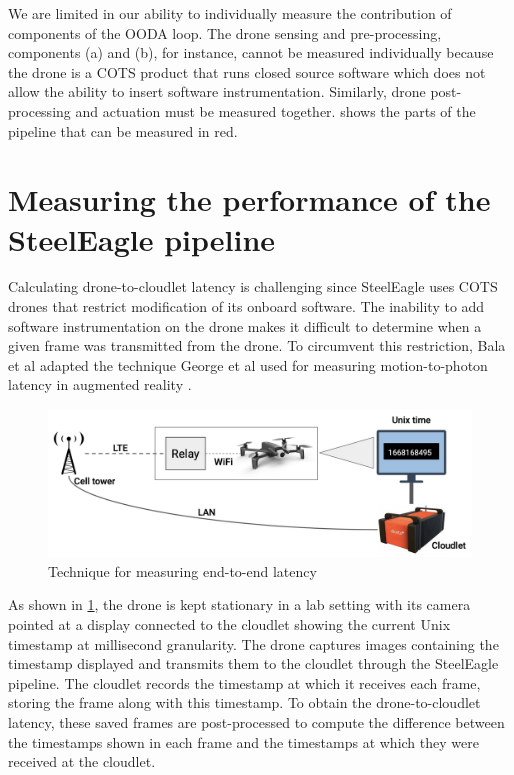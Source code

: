 We are limited in our ability to individually measure the contribution of
components of the OODA loop. The drone sensing and pre-processing, components
(a) and (b), for instance, cannot be measured individually because the drone is
a COTS product that runs closed source software which does not allow the
ability to insert software instrumentation. Similarly, drone post-processing
and actuation must be measured together.   shows
the parts of the pipeline that can be measured in red.

\section{Measuring the performance of the SteelEagle pipeline}
\label{sec:steeleagle-performance-measurement}

Calculating drone-to-cloudlet latency is challenging since SteelEagle uses COTS
drones that restrict modification of its onboard software. The inability to add
software instrumentation on the drone makes it difficult to determine when a
given frame was transmitted from the drone. To circumvent this restriction,
Bala et al adapted the technique George et al used for measuring
motion-to-photon latency in augmented reality \cite{george20}.


\begin{figure}[htbp]
\centerline{\includegraphics[width = .8\textwidth]{figs/mtp_pipeline.png}}
\caption{Technique for measuring end-to-end latency}
\label{fig:latency-measuring-technique}
\end{figure}
As shown in \cref{fig:latency-measuring-technique}, the drone is kept
stationary in a lab setting with its camera pointed at a display connected to
the cloudlet showing the current Unix timestamp at millisecond granularity. The
drone captures images containing the timestamp displayed and transmits them to
the cloudlet through the SteelEagle pipeline. The cloudlet records the
timestamp at which it receives each frame, storing the frame along with this
timestamp. To obtain the drone-to-cloudlet latency, these saved frames are
post-processed to compute the difference between the timestamps shown in each
frame and the timestamps at which they were received at the cloudlet.

